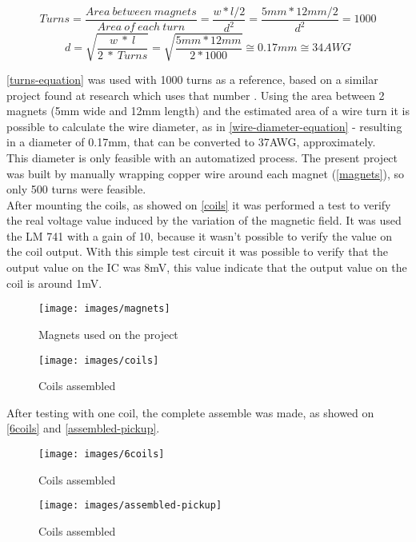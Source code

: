 \begin{equation}
  \label{turns-equation}
  Turns = \frac{Area\ between\ magnets}{Area\ of\ each\ turn} = \frac{ w * l / 2 }{ d^{2} } = \frac{5mm * 12mm / 2}{d^2} = 1000
\end{equation}
\begin{equation}
  \label{wire-diameter-equation}
  d = \sqrt{\frac{w\ *\ l}{2\ *\ Turns}} = \sqrt{\frac{5mm * 12mm}{2*1000}} \cong 0.17mm \cong 34AWG
\end{equation}

\autoref{turns-equation} was used with 1000 turns as a reference, based on a similar project found
at research which uses that number \cite{hexaphonic-pickup}. Using the area between 2 magnets (5mm wide
and 12mm length) and the estimated area of a wire turn it is possible to calculate the wire diameter,
as in \autoref{wire-diameter-equation} - resulting in a diameter of 0.17mm, that can be
converted to 37AWG, approximately. \\
This diameter is only feasible with an automatized process. The present project was built by manually
wrapping copper wire around each magnet (\autoref{magnets}), so only 500 turns were feasible. \\
After mounting the coils, as showed on \autoref{coils} it was performed a test to verify the real voltage value induced by
the variation of the magnetic field. It was used the LM 741 \cite{LM741} with a gain of 10,
because it wasn't possible to verify the value on the coil output. With this simple test circuit
it was possible to verify that the output value on the IC was 8mV, this value indicate that the
output value on the coil is around 1mV.

\begin{figure}[!htpb]
  \centering
  \caption{Magnets used on the project}
  \label{magnets}
  \texttt{[image: images/magnets]}
\end{figure}

\begin{figure}[!htpb]
  \centering
  \caption{Coils assembled}
  \label{coils}
  \texttt{[image: images/coils]}
\end{figure}

After testing with one coil, the complete assemble was made, as showed on \autoref{6coils}
and \autoref{assembled-pickup}.

\begin{figure}[!htpb]
  \centering
  \caption{Coils assembled}
  \label{6coils}
  \texttt{[image: images/6coils]}
\end{figure}

\begin{figure}[!htpb]
  \centering
  \caption{Coils assembled}
  \label{assembled-pickup}
  \texttt{[image: images/assembled-pickup]}
\end{figure}
